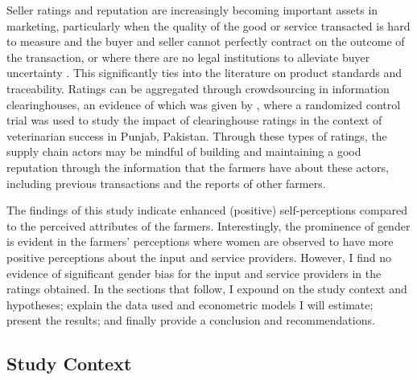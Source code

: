 \documentclass[12pt,english]{article}\usepackage[]{graphicx}\usepackage[]{color}
\begin{document}
\begin{onehalfspace}
Seller ratings and reputation are increasingly becoming important
assets in marketing, particularly when the quality of the good or
service transacted is hard to measure and the buyer and seller cannot
perfectly contract on the outcome of the transaction, or where there
are no legal institutions to alleviate buyer uncertainty \citep{BarIsaac2008}.
This significantly ties into the literature on product standards and
traceability. Ratings can be aggregated through crowdsourcing in information
clearinghouses, an evidence of which was given by \citet{Hasanain2019},
where a randomized control trial was used to study the impact of clearinghouse
ratings in the context of veterinarian success in Punjab, Pakistan.
Through these types of ratings, the supply chain actors may be mindful
of building and maintaining a good reputation through the information
that the farmers have about these actors, including previous transactions
and the reports of other farmers.
\end{onehalfspace}

The findings of this study indicate enhanced (positive) self-perceptions
compared to the perceived attributes of the farmers. Interestingly,
the prominence of gender is evident in the farmers' perceptions where
women are observed to have more positive perceptions about the input
and service providers. However, I find no evidence of significant
gender bias for the input and service providers in the ratings obtained.
In the sections that follow, I expound on the study context and hypotheses;
explain the data used and econometric models I will estimate; present
the results; and finally provide a conclusion and recommendations.

\begin{onehalfspace}
\newpage{}
\end{onehalfspace}
\begin{onehalfspace}

\section{Study Context\label{sec:Study-Context}}
\end{onehalfspace}
\end{document}
